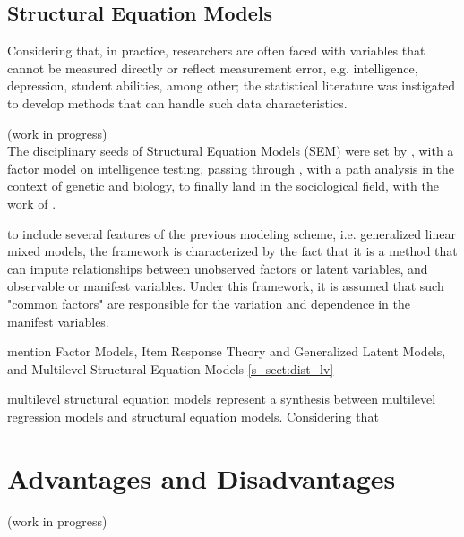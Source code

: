 \subsection{Structural Equation Models}

Considering that, in practice, researchers are often faced with variables that cannot be measured directly or reflect measurement error, e.g. intelligence, depression, student abilities, among other; the statistical literature was instigated to develop methods that can handle such data characteristics. 

{\color{red}(work in progress) \\
The disciplinary seeds of Structural Equation Models (SEM) were set by \cite{Spearman_1904}, with a factor model on intelligence testing, passing through \cite{Wright_1920}, with a path analysis in the context of genetic and biology, to finally land in the sociological field, with the work of \cite{Blalock_1961}.

to include several features of the previous modeling scheme, i.e. generalized linear mixed models, the framework is characterized by the fact that it is a method that can impute relationships between unobserved factors or latent variables, and observable or manifest variables. Under this framework, it is assumed that such "common factors" are responsible for the variation and dependence in the manifest variables.

mention Factor Models, Item Response Theory and Generalized Latent Models, and Multilevel Structural Equation Models
\ref{s_sect:dist_lv}


multilevel structural equation models represent a synthesis between multilevel regression models and structural equation models. Considering that 
}




\section{Advantages and Disadvantages}
{\color{red}(work in progress)}